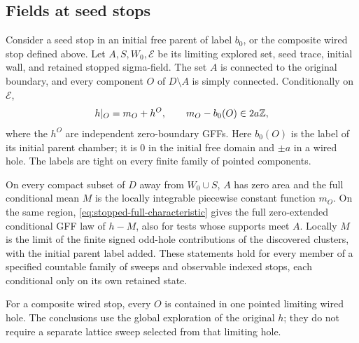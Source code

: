 \subsection{Fields at seed stops}

\begin{proposition}
\label{prop:exploration-thin}
Consider a seed stop in an initial free parent of label \(b_0\), or
the composite wired stop defined above. Let \(A,S,W_0,\mathscr E\)
be its limiting explored set, seed trace, initial wall, and retained
stopped sigma-field. The set \(A\) is connected to the original
boundary, and every component \(O\) of \(D\setminus A\) is simply
connected. Conditionally on \(\mathscr E\),
\begin{equation}
 h|_O=m_O+h^O,\qquad m_O-b_0(O)\in2a\mathbb Z,
 \label{eq:stopped-component-law}
\end{equation}
where the \(h^O\) are independent zero-boundary GFFs. Here \(b_0(O)\)
is the label of its initial parent chamber; it is \(0\) in the
initial free domain and \(\pm a\) in a wired hole. The labels are
tight on every finite family of pointed components.

On every compact subset of \(D\) away from \(W_0\cup S\), \(A\) has
zero area and the full conditional mean \(M\) is the locally
integrable piecewise constant function \(m_O\). On the same region,
\cref{eq:stopped-full-characteristic} gives the full zero-extended
conditional GFF law of \(h-M\), also for tests whose supports meet
\(A\). Locally \(M\) is the limit of the finite signed odd-hole
contributions of the discovered clusters, with the initial parent
label added. These statements hold for every member of a specified
countable family of sweeps and observable indexed stops, each
conditional only on its own retained state.

For a composite wired stop, every \(O\) is contained in one pointed
limiting wired hole. The conclusions use the global exploration of
the original \(h\); they do not require a separate lattice sweep
selected from that limiting hole.
\end{proposition}

